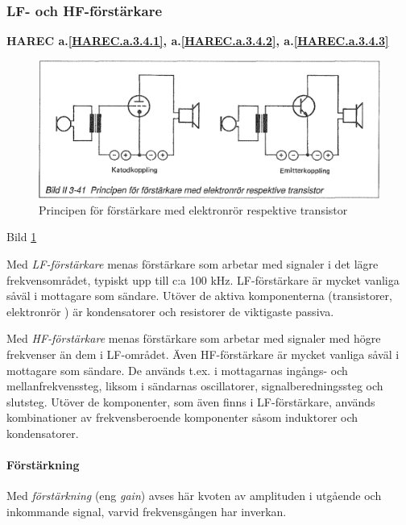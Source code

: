 \subsubsection{LF- och HF-förstärkare}
\textbf{HAREC a.\ref{HAREC.a.3.4.1}, a.\ref{HAREC.a.3.4.2}, a.\ref{HAREC.a.3.4.3}\label{myHAREC.a.3.4.1}\label{myHAREC.a.3.4.2}\label{myHAREC.a.3.4.3}}

\begin{figure}
\includegraphics[width=\textwidth]{images/bild_2_3-41}
\caption{Principen för förstärkare med elektronrör respektive transistor}
\label{fig:BildII3-41}
\end{figure}

Bild \ref{fig:BildII3-41}

Med \emph{LF-förstärkare} menas förstärkare som arbetar med signaler i
det lägre frekvensområdet, typiskt upp till c:a 100
kHz. LF-förstärkare är mycket vanliga såväl i mottagare som
sändare. Utöver de aktiva komponenterna (transistorer, elektronrör )
är kondensatorer och resistorer de viktigaste passiva.

Med \emph{HF-förstärkare} menas förstärkare som arbetar med signaler
med högre frekvenser än dem i LF-området. Även HF-förstärkare är
mycket vanliga såväl i mottagare som sändare. De används t.ex. i
mottagarnas ingångs- och mellanfrekvenssteg, liksom i sändarnas
oscillatorer, signalberedningssteg och slutsteg.  Utöver de
komponenter, som även finns i LF-förstärkare, används kombinationer av
frekvensberoende komponenter såsom induktorer och kondensatorer.

\paragraph{Förstärkning}
Med \emph{förstärkning} (eng \emph{gain}) avses här kvoten av amplituden i utgående och
inkommande signal, varvid frekvensgången har inverkan.

